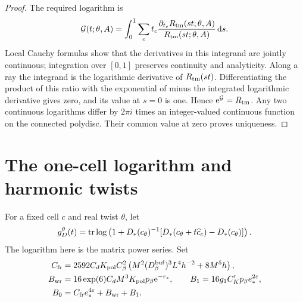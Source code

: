 \begin{proof}
The required logarithm is
\begin{equation}\label{eq:interacting-logarithm}
 \mathcal G(t;\theta,A)=
 \int_0^1\sum_ct_c
       \frac{\partial_{t_c}R_{\rm tm}(st;\theta,A)}
            {R_{\rm tm}(st;\theta,A)}\,\mathrm d s .
\end{equation}
Local Cauchy formulas show that the derivatives
in this integrand are jointly continuous;
integration over $[0,1]$ preserves continuity
and analyticity. Along a ray the integrand is
the logarithmic derivative of $R_{\rm tm}(st)$.
Differentiating the product of this ratio with
the exponential of minus the integrated
logarithmic derivative gives zero, and its
value at $s=0$ is one. Hence
$\mathrm e^{\mathcal G}=R_{\rm tm}$.
Any two continuous logarithms differ by
$2\pi i$ times an integer-valued continuous
function on the connected polydisc. Their
common value at zero proves uniqueness.
\end{proof}

\section{The one-cell logarithm and harmonic twists}
\label{subsec:interacting-one-cell}

For a fixed cell $c$ and real twist $\theta$, let
\begin{equation}\label{eq:interacting-free-coarse-log}
 g_D^\theta(t)=\operatorname{tr}\log\left(1+D_*(c_\theta)^{-1}
                   [D_*(c_\theta+t\widehat c_c)-D_*(c_\theta)]\right).
\end{equation}
The logarithm here is the matrix power series.
Set
\begin{align}
 C_{\rm fr}&=2592C_dK_{\mathrm{pol}}C_\beta^2
       \left(M^2(D_\beta^{\rm buf})^3L^4h^{-2}+8M^5h\right),
                                                   \notag\\
 B_{\rm wr}&=16\exp(6)C_dM^3K_{\mathrm{pol}}p_\beta \mathrm e^{-r_*},
 \qquad B_1=16g_1C_K'p_\beta e_*^{2\varepsilon},       \notag\\
 B_0&=C_{\rm fr}e_*^{4\varepsilon}+B_{\rm wr}+B_1 .
                                \label{eq:interacting-free-log-constants}
\end{align}

